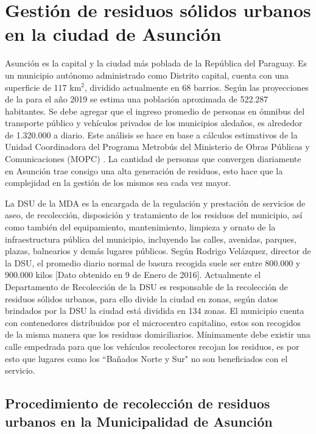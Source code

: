 \section{Gestión de residuos sólidos urbanos en la ciudad de Asunción}

Asunción es la capital y la ciudad más poblada de la República del Paraguay. Es un municipio autónomo administrado como Distrito capital, cuenta con una superficie de 117 km$^{2}$, dividido actualmente en 68 barrios. Según las proyecciones de la \citet*{DireccionGeneraldeEstadistica2015Paraguay2000-2025} para el año 2019 se estima una población aproximada de 522.287 habitantes. Se debe agregar que el ingreso promedio de personas en ómnibus del transporte público y vehículos privados de los municipios aledaños, es alrededor de 1.320.000 a diario. Este análisis se hace en base a cálculos estimativos de la Unidad Coordinadora del Programa Metrobús del Ministerio de Obras Públicas y Comunicaciones (MOPC) \citep{DiarioABCColor2016PorColor}. La cantidad de personas que convergen diariamente en Asunción trae consigo una alta generación de residuos, esto hace que la complejidad en la gestión de los mismos sea cada vez mayor.

La DSU de la MDA es la encargada de la regulación y prestación de servicios de aseo, de recolección, disposición y tratamiento de los residuos del municipio, así como también del equipamiento, mantenimiento, limpieza y ornato de la infraestructura pública del municipio, incluyendo las calles, avenidas, parques, plazas, balnearios y demás lugares públicos. Según Rodrigo Velázquez, director de la DSU, el promedio diario normal de basura recogida suele ser entre 800.000 y 900.000 kilos \citep{LaNacion2016AsuncionBasura} [Dato obtenido en 9 de Enero de 2016]. 
Actualmente el Departamento de Recolección de la DSU es responsable de la recolección de residuos sólidos urbanos, para ello divide la ciudad en zonas, según datos brindados por la DSU la ciudad está dividida en 134 zonas. El municipio cuenta con contenedores distribuidos por el microcentro capitalino, estos son recogidos de la misma manera que los residuos domiciliarios. Mínimamente debe existir una calle empedrada para que los vehículos recolectores recojan los residuos, es por esto que lugares como los ``Bañados Norte y Sur" no son beneficiados con el servicio.

\subsection{Procedimiento de recolección de residuos urbanos en la Municipalidad de Asunción}

